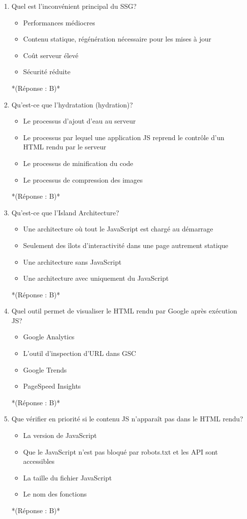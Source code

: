\documentclass[12pt,a4paper,twoside]{report}
\begin{document}
\begin{enumerate}
\item Quel est l'inconvénient principal du SSG?
\begin{itemize}
\item[A)] Performances médiocres
\item[B)] Contenu statique, régénération nécessaire pour les mises à jour
\item[C)] Coût serveur élevé
\item[D)] Sécurité réduite
\end{itemize}
*(Réponse : B)*

\item Qu'est-ce que l'hydratation (hydration)?
\begin{itemize}
\item[A)] Le processus d'ajout d'eau au serveur
\item[B)] Le processus par lequel une application JS reprend le contrôle d'un HTML rendu par le serveur
\item[C)] Le processus de minification du code
\item[D)] Le processus de compression des images
\end{itemize}
*(Réponse : B)*

\item Qu'est-ce que l'Island Architecture?
\begin{itemize}
\item[A)] Une architecture où tout le JavaScript est chargé au démarrage
\item[B)] Seulement des îlots d'interactivité dans une page autrement statique
\item[C)] Une architecture sans JavaScript
\item[D)] Une architecture avec uniquement du JavaScript
\end{itemize}
*(Réponse : B)*

\item Quel outil permet de visualiser le HTML rendu par Google après exécution JS?
\begin{itemize}
\item[A)] Google Analytics
\item[B)] L'outil d'inspection d'URL dans GSC
\item[C)] Google Trends
\item[D)] PageSpeed Insights
\end{itemize}
*(Réponse : B)*

\item Que vérifier en priorité si le contenu JS n'apparaît pas dans le HTML rendu?
\begin{itemize}
\item[A)] La version de JavaScript
\item[B)] Que le JavaScript n'est pas bloqué par robots.txt et les API sont accessibles
\item[C)] La taille du fichier JavaScript
\item[D)] Le nom des fonctions
\end{itemize}
*(Réponse : B)*


\end{enumerate}
\end{document}
